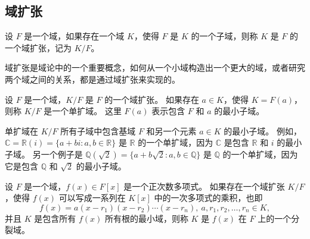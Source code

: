 
\vspace{1em}

\subsection{域扩张}

\begin{definition}
    设 $F$ 是一个域，如果存在一个域 $K$，使得 $F$ 是 $K$ 的一个子域，则称 $K$ 是 $F$ 的一个域扩张，记为 $K/F$。
    \label{def:field_extension}
\end{definition}
\begin{note}
    域扩张是域论中的一个重要概念，如何从一个小域构造出一个更大的域，或者研究两个域之间的关系，都是通过域扩张来实现的。
\end{note}

\begin{definition}
    设 $F$ 是一个域，$K/F$ 是 $F$ 的一个域扩张。
    如果存在 $a\in K$，使得 $K=F(a)$，则称 $K/F$ 是一个单扩域。
    这里 $F(a)$ 表示包含 $F$ 和 $a$ 的最小子域。
    \label{def:simple_extension}
\end{definition}
\begin{note}
    单扩域在 $K/F$ 所有子域中包含基域 $F$ 和另一个元素 $a\in K$ 的最小子域。
    例如，$\mathbb{C}=\mathbb{R}(i)= \{a+bi:a,b\in \mathbb{R}\}$ 是 $\mathbb{R}$ 的一个单扩域，因为 $\mathbb{C}$ 是包含 $\mathbb{R}$ 和 $i$ 的最小子域。
    另一个例子是 $\mathbb{Q}(\sqrt{2}) = \{a+b\sqrt{2}:a,b\in \mathbb{Q}\}$ 是 $\mathbb{Q}$ 的一个单扩域，因为它是包含 $\mathbb{Q}$ 和 $\sqrt{2}$ 的最小子域。
\end{note}

\begin{definition}
    设 $F$ 是一个域，$f(x)\in F[x]$ 是一个正次数多项式。
    如果存在一个域扩张 $K/F$，使得 $f(x)$ 可以写成一系列在 $K[x]$ 中的一次多项式的乘积，也即
    \[
        f(x) = a(x - r_1)(x - r_2) \cdots (x - r_n),\ a,r_1,r_2,\ldots,r_n \in K,
    \]
    并且 $K$ 是包含所有 $f(x)$ 所有根的最小域，则称 $K$ 是 $f(x)$ 在 $F$ 上的一个分裂域。
    \label{def:splitting_field}
\end{definition}



